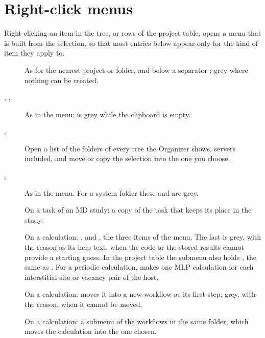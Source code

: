 \section{Right-click menus}
Right-clicking an item in the tree, or rows of the project table, opens a menu that is built from the selection, so that most entries below appear only for the kind of item they apply to.
\begin{description}
	\item[] As  for the nearest project or folder, and below a separator ; grey where nothing can be created.
	\item[, , ] As in the  menu;  is grey while the clipboard is empty.
	\item[, ] Open a list of the folders of every tree the Organizer shows, servers included, and move or copy the selection into the one you choose.
	\item[, ] As in the  menu. For a system folder these and  are grey.
	\item[] On a task of an MD study: a copy of the task that keeps its place in the study.
	\item[] On a calculation: ,  and , the three  items of the  menu. The last is grey, with the reason as its help text, when the code or the stored results cannot provide a starting guess. In the project table the submenu also holds , the same as . For a periodic calculation,  makes one MLP calculation for each interstitial site or vacancy pair of the host.
	\item[] On a calculation: moves it into a new workflow as its first step; grey, with the reason, when it cannot be moved.
	\item[] On a calculation: a submenu of the workflows in the same folder, which moves the calculation into the one chosen.

\end{description}
